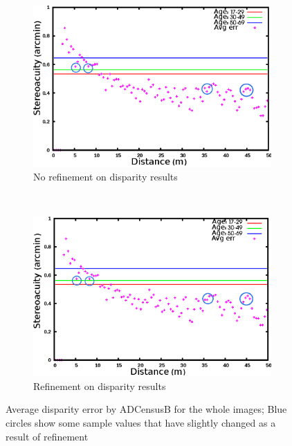 \begin{figure}[H]
\centering
\begin{subfigure}{\linewidth}
\centering
\includegraphics[scale=0.95]{adcenfull3NoLRmrk}
\caption{No refinement on disparity results}
\label{fig:adcfnoLR}
\vspace{2mm}
\end{subfigure} \\
\begin{subfigure}{\linewidth}
\centering
\includegraphics[scale=0.95]{adcenfull3mrk}
\caption{Refinement on disparity results}
\label{fig:adcf3mrk}
\end{subfigure}
\caption{Average disparity error by ADCensusB for the whole images; Blue circles show some sample values that have slightly changed as a result of refinement}
\label{fig:adcFLRnoLR}
\end{figure} 

